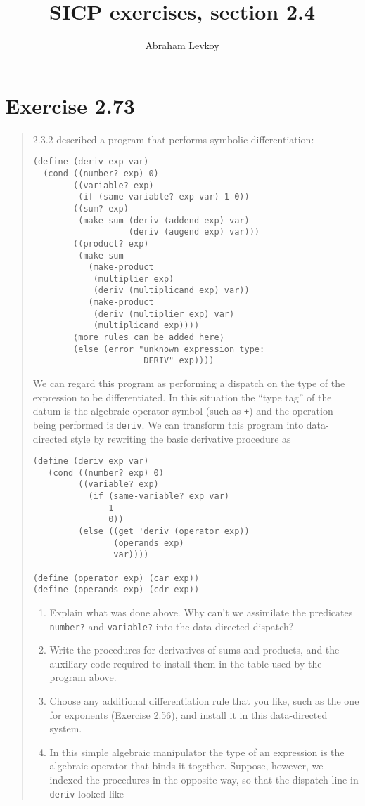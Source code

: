 \documentclass{article}
\author{Abraham Levkoy}
\title{SICP exercises, section 2.4}
\begin{document}
\maketitle

\section{Exercise 2.73}
\begin{quote}
    2.3.2 described a program that performs symbolic differentiation:

    \begin{lstlisting}
(define (deriv exp var)
  (cond ((number? exp) 0)
        ((variable? exp)
         (if (same-variable? exp var) 1 0))
        ((sum? exp)
         (make-sum (deriv (addend exp) var)
                   (deriv (augend exp) var)))
        ((product? exp)
         (make-sum
           (make-product
            (multiplier exp)
            (deriv (multiplicand exp) var))
           (make-product
            (deriv (multiplier exp) var)
            (multiplicand exp))))
        ⟨more rules can be added here⟩
        (else (error "unknown expression type:
                      DERIV" exp))))
    \end{lstlisting}

    We can regard this program as performing a dispatch on the type of the
    expression to be differentiated. In this situation the ``type tag'' of the
    datum is the algebraic operator symbol (such as \texttt{+}) and the
    operation being performed is \texttt{deriv}. We can transform this program
    into data-directed style by rewriting the basic derivative procedure as

    \begin{lstlisting}
(define (deriv exp var)
   (cond ((number? exp) 0)
         ((variable? exp)
           (if (same-variable? exp var)
               1
               0))
         (else ((get 'deriv (operator exp))
                (operands exp)
                var))))

(define (operator exp) (car exp))
(define (operands exp) (cdr exp))
    \end{lstlisting}

    \begin{enumerate}
        \item Explain what was done above. Why can’t we assimilate the
            predicates \texttt{number?} and \texttt{variable?} into the
            data-directed dispatch?
        \item Write the procedures for derivatives of sums and products, and
            the auxiliary code required to install them in the table used by
            the program above.
        \item Choose any additional differentiation rule that you like, such as
            the one for exponents (Exercise 2.56), and install it in this
            data-directed system.
        \item In this simple algebraic manipulator the type of an expression is
            the algebraic operator that binds it together. Suppose, however, we
            indexed the procedures in the opposite way, so that the dispatch
            line in \texttt{deriv} looked like


\end{enumerate}
\end{quote}
\end{document}
